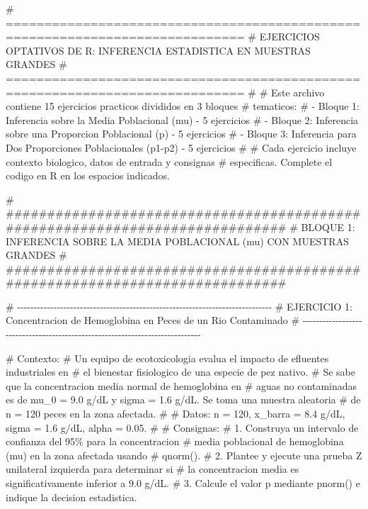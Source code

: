 \documentclass[
  spanish,
  letterpaper,
  DIV=11,
  numbers=noendperiod]{scrreprt}
\newenvironment{Shaded}{\begin{snugshade}}{\end{snugshade}}
\newcommand{\CommentTok}[1]{\textcolor[rgb]{0.37,0.37,0.37}{#1}}
\begin{document}
\begin{Shaded}
\begin{Highlighting}[]

\CommentTok{\# =============================================================================}
\CommentTok{\# EJERCICIOS OPTATIVOS DE R: INFERENCIA ESTADISTICA EN MUESTRAS GRANDES}
\CommentTok{\# =============================================================================}
\CommentTok{\#}
\CommentTok{\# Este archivo contiene 15 ejercicios practicos divididos en 3 bloques}
\CommentTok{\# tematicos:}
\CommentTok{\#   {-} Bloque 1: Inferencia sobre la Media Poblacional (mu)              {-} 5 ejercicios}
\CommentTok{\#   {-} Bloque 2: Inferencia sobre una Proporcion Poblacional (p)         {-} 5 ejercicios}
\CommentTok{\#   {-} Bloque 3: Inferencia para Dos Proporciones Poblacionales (p1{-}p2)  {-} 5 ejercicios}
\CommentTok{\#}
\CommentTok{\# Cada ejercicio incluye contexto biologico, datos de entrada y consignas}
\CommentTok{\# especificas. Complete el codigo en R en los espacios indicados.}


\CommentTok{\# \#\#\#\#\#\#\#\#\#\#\#\#\#\#\#\#\#\#\#\#\#\#\#\#\#\#\#\#\#\#\#\#\#\#\#\#\#\#\#\#\#\#\#\#\#\#\#\#\#\#\#\#\#\#\#\#\#\#\#\#\#\#\#\#\#\#\#\#\#\#\#\#\#\#\#\#\#}
\CommentTok{\# BLOQUE 1: INFERENCIA SOBRE LA MEDIA POBLACIONAL (mu) CON MUESTRAS GRANDES}
\CommentTok{\# \#\#\#\#\#\#\#\#\#\#\#\#\#\#\#\#\#\#\#\#\#\#\#\#\#\#\#\#\#\#\#\#\#\#\#\#\#\#\#\#\#\#\#\#\#\#\#\#\#\#\#\#\#\#\#\#\#\#\#\#\#\#\#\#\#\#\#\#\#\#\#\#\#\#\#\#\#}

\CommentTok{\# {-}{-}{-}{-}{-}{-}{-}{-}{-}{-}{-}{-}{-}{-}{-}{-}{-}{-}{-}{-}{-}{-}{-}{-}{-}{-}{-}{-}{-}{-}{-}{-}{-}{-}{-}{-}{-}{-}{-}{-}{-}{-}{-}{-}{-}{-}{-}{-}{-}{-}{-}{-}{-}{-}{-}{-}{-}{-}{-}{-}{-}{-}{-}{-}{-}{-}{-}{-}{-}{-}{-}{-}{-}{-}{-}{-}{-}}
\CommentTok{\# EJERCICIO 1: Concentracion de Hemoglobina en Peces de un Rio Contaminado}
\CommentTok{\# {-}{-}{-}{-}{-}{-}{-}{-}{-}{-}{-}{-}{-}{-}{-}{-}{-}{-}{-}{-}{-}{-}{-}{-}{-}{-}{-}{-}{-}{-}{-}{-}{-}{-}{-}{-}{-}{-}{-}{-}{-}{-}{-}{-}{-}{-}{-}{-}{-}{-}{-}{-}{-}{-}{-}{-}{-}{-}{-}{-}{-}{-}{-}{-}{-}{-}{-}{-}{-}{-}{-}{-}{-}{-}{-}{-}{-}}

\CommentTok{\# Contexto:}
\CommentTok{\# Un equipo de ecotoxicologia evalua el impacto de efluentes industriales en}
\CommentTok{\# el bienestar fisiologico de una especie de pez nativo. }
\CommentTok{\# Se sabe que la concentracion media normal de hemoglobina en}
\CommentTok{\# aguas no contaminadas es de mu\_0 = 9.0 g/dL y sigma = 1.6 g/dL. Se toma una muestra aleatoria}
\CommentTok{\# de n = 120 peces en la zona afectada.}
\CommentTok{\#}
\CommentTok{\# Datos: n = 120, x\_barra = 8.4 g/dL, sigma = 1.6 g/dL, alpha = 0.05.}
\CommentTok{\#}
\CommentTok{\# Consignas:}
\CommentTok{\# 1. Construya un intervalo de confianza del 95\% para la concentracion}
\CommentTok{\#    media poblacional de hemoglobina (mu) en la zona afectada usando}
\CommentTok{\#    qnorm().}
\CommentTok{\# 2. Plantee y ejecute una prueba Z unilateral izquierda para determinar si}
\CommentTok{\#    la concentracion media es significativamente inferior a 9.0 g/dL.}
\CommentTok{\# 3. Calcule el valor p mediante pnorm() e indique la decision estadistica.}


\end{Highlighting}
\end{Shaded}
\end{document}
